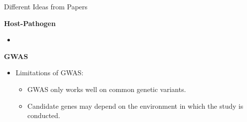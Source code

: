\documentclass[UTF8]{book}
\date{}
\begin{document}
\kaishu
\begin{center}
\Large{Different Ideas from Papers}
\end{center}
\textbf{Host-Pathogen}
\begin{itemize}
\item 
\end{itemize}
\textbf{GWAS}
\begin{itemize}
\item Limitations of GWAS\cite{macpherson2018keeping}:
\begin{itemize}
	\item GWAS only works well on common genetic variants\cite{manolio2009finding}.
	\item Candidate genes may depend on the environment in which the study is conducted\cite{thomas2010gene}.
\end{itemize}
\end{itemize}
 

\end{document}
